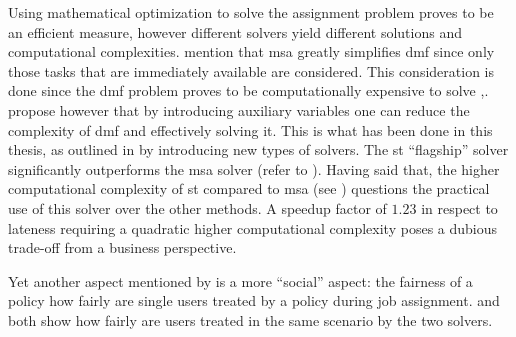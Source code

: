 \documentclass[draft=false]{seal_thesis}
\begin{document}
Using mathematical optimization to solve the assignment problem proves to be an efficient measure, however different solvers yield different solutions and computational complexities. \citet[p. 15]{Zeng2005} mention that \gls{msa} greatly simplifies \gls{dmf} since only those tasks that are immediately available are considered. This consideration is done since the \gls{dmf} problem proves to be computationally expensive to solve \citep[p. 13]{Zeng2005},\citep{Garey1990}. \citet[p. 13]{Zeng2005} propose however that by introducing auxiliary variables one can reduce the complexity of \gls{dmf} and effectively solving it. This is what has been done in this thesis, as outlined in  by introducing new types of solvers. The \gls{st} ``flagship'' solver significantly outperforms the \gls{msa} solver (refer to ). Having said that, the higher computational complexity of \gls{st} compared to \gls{msa} (see ) questions the practical use of this solver over the other methods. A speedup factor of $1.23$ in respect to lateness requiring a quadratic higher computational complexity poses a dubious trade-off from a business perspective.


Yet another aspect mentioned by \citet[pp. 17-18]{Zeng2005} is a more ``social'' aspect: the fairness of a policy \ie how fairly are single users treated by a policy during job assignment.  and  both show how fairly are users treated in the same scenario by the two solvers.
\end{document}
